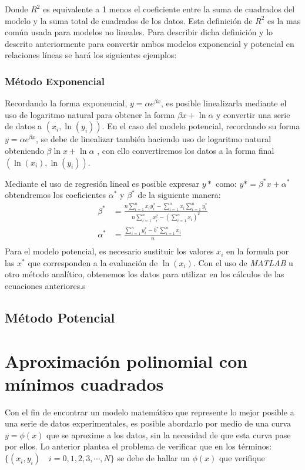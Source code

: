 \documentclass[11pt,letterpaper]{article}
\begin{document}
Donde $R^2$ es equivalente a 1 menos el coeficiente entre la suma de cuadrados del modelo y la suma total de cuadrados de los datos. Esta definición de $R^2$ es la mas común usada para modelos no lineales. Para describir dicha definición y lo descrito anteriormente para convertir ambos modelos exponencial y potencial en relaciones líneas se hará los siguientes ejemplos:

\subsubsection{Método Exponencial}
Recordando la forma exponencial, $y = \alpha e^{\beta x}$, es posible linealizarla mediante el uso de logaritmo natural para obtener la forma $\beta x + \ln \alpha$ y convertir una serie de datos a $(x_i, \ln(y_i))$. En el caso del modelo potencial, recordando su forma $y = \alpha e^{\beta x}$, se debe de linealizar también haciendo uso de logaritmo natural obteniendo $\beta \ln x + \ln \alpha$ , con ello convertiremos los datos a la forma final $(\ln(x_i), \ln(y_i))$.  \cite{ualberta}
\par
Mediante el uso de regresión lineal es posible expresar $y*$ como: \textbf{$y* = \beta^* x + \alpha^*$ 	} obtendremos los coeficientes $\alpha^*$ y $\beta^*$ de la siguiente manera:
\begin{align*}
	\beta^* &= \frac{n \sum_{i=1}^{n} x_iy_i^* - \sum_{i=1}^{n} x_i \sum_{i=1}^{n} y_i^*}{n\sum_{i=1}^{n} x_i^2 - (\sum_{i=1}^{n}  x_i)^2} \\
	\alpha^* &= \frac{\sum_{i=1}^{n} y_i^* - b^* \sum_{i=1}^{n} x_i  }{n} \\
\end{align*}
Para el modelo potencial, es necesario sustituir los valores $x_i$ en la formula por las $x^*$ que corresponden a la evaluación de $\ln(x_i)$.
Con el uso de \textit{MATLAB} u otro método analítico, obtenemos los datos para utilizar en los cálculos de las ecuaciones anteriores.s
\subsection{Método Potencial}


\section{Aproximación polinomial con mínimos cuadrados}
Con el fin de encontrar un modelo matemático que represente lo mejor posible a una serie de datos experimentales, es posible abordarlo por medio de una curva $y=\phi(x)$ que se aproxime a los datos, sin la necesidad de que esta curva pase por ellos.
Lo anterior plantea el problema de verificar que en los términos:
$\{(x_i, y_i)\quad i = 0,1,2,3, \cdots, N\} $ se debe de hallar un $\phi(x)$ que verifique
\end{document}
